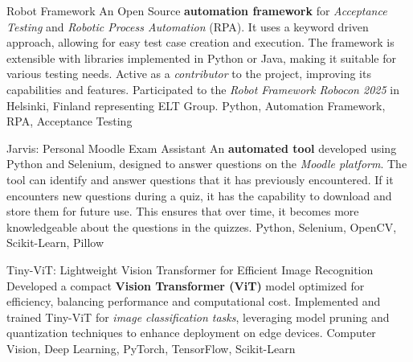 
\begin{projects}
  \project
  {Robot Framework}{}
  { }
  {An Open Source \textbf{automation framework} for \textit{Acceptance Testing} and \textit{Robotic Process Automation} (RPA). It uses a keyword driven approach, allowing for easy test case creation and execution. The framework is extensible with libraries implemented in Python or Java, making it suitable for various testing needs. Active as a \textit{contributor} to the project, improving its capabilities and features. Participated to the \textit{Robot Framework Robocon 2025} in Helsinki, Finland representing ELT Group.}
  {Python, Automation Framework, RPA, Acceptance Testing}

  \project
  {Jarvis: Personal Moodle Exam Assistant}{}
  {}
  {An \textbf{automated tool} developed using Python and Selenium, designed to answer questions on the \textit{Moodle platform}. The tool can identify and answer questions that it has previously encountered. If it encounters new questions during a quiz, it has the capability to download and store them for future use. This ensures that over time, it becomes more knowledgeable about the questions in the quizzes.}
  {Python, Selenium, OpenCV, Scikit-Learn, Pillow}

  \project
  {Tiny-ViT: Lightweight Vision Transformer for Efficient Image Recognition}{}
  {}
  {Developed a compact \textbf{Vision Transformer (ViT)} model optimized for efficiency, balancing performance and computational cost. Implemented and trained Tiny-ViT for \textit{image classification tasks}, leveraging model pruning and quantization techniques to enhance deployment on edge devices.}
  {Computer Vision, Deep Learning, PyTorch, TensorFlow, Scikit-Learn}
\end{projects}
